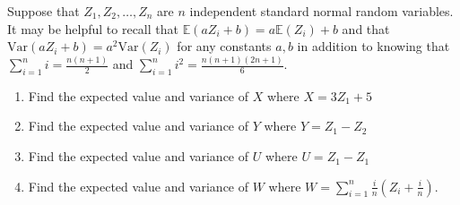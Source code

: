 \documentclass[11pt]{article}
\begin{document}
\item 
   Suppose that $Z_1, Z_2, \ldots, Z_n$ are $n$ independent standard normal random variables.
   It may be helpful to recall that $\mathbb{E}(a Z_i + b) = a \mathbb{E}(Z_i) + b$ and that $\text{Var}(a Z_i + b) = a^2 \text{Var}(Z_i)$ for any constants $a, b$ in addition to knowing that $\sum_{i=1}^{n} i = \frac{n(n+1)}{2}$ and $\sum_{i=1}^n i^2 = \frac{n(n+1)(2n+1)}{6}$.

   \begin{enumerate}
   \item 
      Find the expected value and variance of $X$ where $X = 3 Z_1 + 5$

   \item 
      Find the expected value and variance of $Y$ where $Y = Z_1 - Z_2$

   \item 
      Find the expected value and variance of $U$ where $U = Z_1 - Z_1$

   \item 
      Find the expected value and variance of $W$ where $W = \sum_{i=1}^n \frac{i}{n} \left(Z_i + \frac{i}{n}\right)$.
   \end{enumerate}
\end{document}
